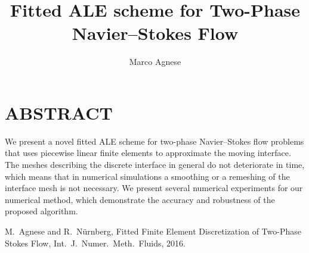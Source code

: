 \documentclass{smpstyle}
\title{Fitted ALE scheme for Two-Phase Navier--Stokes Flow}
\author{Marco Agnese}
\begin{document}
\maketitle

\section*{ABSTRACT}


We present a novel fitted ALE scheme for two-phase Navier--Stokes flow problems
that uses piecewise linear finite elements to approximate the moving interface.
The meshes describing the discrete interface in general do not deteriorate in
time, which means that in numerical simulations a smoothing or a remeshing of
the interface mesh is not necessary. We present several numerical experiments
for our numerical method, which demonstrate the accuracy and
robustness of the proposed algorithm.

\begin{thebibliography}{99}
M.~Agnese and R.~N\"urnberg, Fitted Finite Element Discretization of Two-Phase
{S}tokes Flow, Int.\ J.\ Numer.\ Meth.\ Fluids, 2016.

\end{thebibliography}
\end{document}
